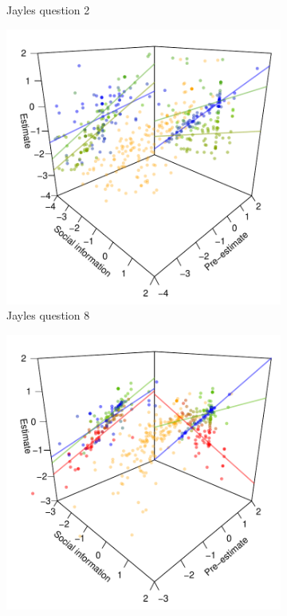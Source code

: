 \documentclass[10pt,a4paper,twocolumn,lineno]{article}
\begin{document}
\begin{figure}[htbp]
\begin{subfigure}[b]{.24\textwidth}
		\caption{Jayles question 2}
	\end{subfigure}
		\begin{subfigure}[b]{.24\textwidth}
		\includegraphics[width=\textwidth]{../plots/jayles8_vs_xp3d.pdf}
		\caption{Jayles question 8}
	\end{subfigure}
	\begin{subfigure}[b]{.24\textwidth}
		\includegraphics[width=\textwidth]{../plots/jayles10_vs_xp3d.pdf}

\end{subfigure}
\end{figure}
\end{document}

